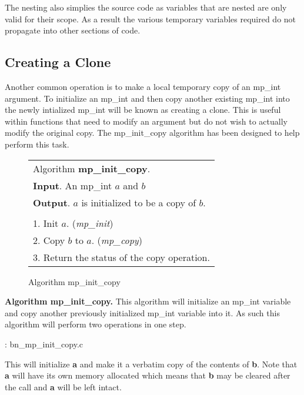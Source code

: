 \documentclass[b5paper]{book}
\begin{document}
The nesting also simplies the source code as variables that are nested are only valid for their scope.  As a result
the various temporary variables required do not propagate into other sections of code.


\subsection{Creating a Clone}
Another common operation is to make a local temporary copy of an mp\_int argument.  To initialize an mp\_int 
and then copy another existing mp\_int into the newly intialized mp\_int will be known as creating a clone.  This is 
useful within functions that need to modify an argument but do not wish to actually modify the original copy.  The 
mp\_init\_copy algorithm has been designed to help perform this task.

\begin{figure}[here]
\begin{center}
\begin{tabular}{l}
\hline Algorithm \textbf{mp\_init\_copy}. \\
\textbf{Input}.   An mp\_int $a$ and $b$\\
\textbf{Output}.  $a$ is initialized to be a copy of $b$. \\
\hline \\
1.  Init $a$.  (\textit{mp\_init}) \\
2.  Copy $b$ to $a$.  (\textit{mp\_copy}) \\
3.  Return the status of the copy operation. \\
\hline
\end{tabular}
\end{center}
\caption{Algorithm mp\_init\_copy}
\end{figure}

\textbf{Algorithm mp\_init\_copy.}
This algorithm will initialize an mp\_int variable and copy another previously initialized mp\_int variable into it.  As 
such this algorithm will perform two operations in one step.  

\vspace{+3mm}\begin{small}
\hspace{-5.1mm}{\bf File}: bn\_mp\_init\_copy.c
\vspace{-3mm}
\begin{alltt}
\end{alltt}
\end{small}

This will initialize \textbf{a} and make it a verbatim copy of the contents of \textbf{b}.  Note that 
\textbf{a} will have its own memory allocated which means that \textbf{b} may be cleared after the call
and \textbf{a} will be left intact.  
\end{document}
